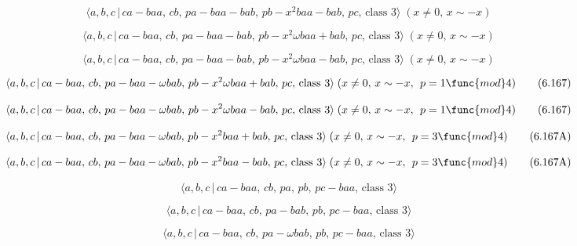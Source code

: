 \documentclass[10pt]{article}
\begin{document}
\begin{equation}
\langle a,b,c\,|\,ca-baa,\,cb,\,pa-baa-bab,\,pb-x^2baa-bab,\,pc,\,\text{
class }3\rangle\;(x \neq 0,\, x\sim -x)  \tag{6.165}
\end{equation}

\begin{equation}
\langle a,b,c\,|\,ca-baa,\,cb,\,pa-baa-bab,\,pb-x^{2}\omega baa+bab,\,pc,\,%
\text{class }3\rangle \;(x\neq 0,\,x\sim -x)  \tag{6.166}
\end{equation}

\begin{equation}
\langle a,b,c\,|\,ca-baa,\,cb,\,pa-baa-bab,\,pb-x^{2}\omega baa-bab,\,pc,\,%
\text{class }3\rangle \;(x\neq 0,\,x\sim -x)  \tag{6.166}
\end{equation}

\begin{equation}
\langle a,b,c\,|\,ca-baa,\,cb,\,pa-baa-\omega bab,\,pb-x^{2}\omega
baa+bab,\,pc,\,\text{class }3\rangle \;(x\neq 0,\,x\sim -x,\,\;p=1\func{mod}%
4)  \tag{6.167}
\end{equation}

\begin{equation}
\langle a,b,c\,|\,ca-baa,\,cb,\,pa-baa-\omega bab,\,pb-x^{2}\omega
baa-bab,\,pc,\,\text{class }3\rangle \;(x\neq 0,\,x\sim -x,\,\;p=1\func{mod}%
4)  \tag{6.167}
\end{equation}

\begin{equation}
\langle a,b,c\,|\,ca-baa,\,cb,\,pa-baa-\omega bab,\,pb-x^2baa+bab,\,pc,\,%
\text{class }3\rangle\;(x \neq 0,\, x\sim -x,\,\;p=3 \func{mod} 4) 
\tag{6.167A}
\end{equation}

\begin{equation}
\langle a,b,c\,|\,ca-baa,\,cb,\,pa-baa-\omega bab,\,pb-x^2baa-bab,\,pc,\,%
\text{class }3\rangle\;(x \neq 0,\, x\sim -x,\,\;p=3 \func{mod} 4) 
\tag{6.167A}
\end{equation}

\begin{equation}
\langle a,b,c\,|\,ca-baa,\,cb,\,pa,\,pb,\,pc-baa,\,\text{class }3\rangle 
\tag{6.168}
\end{equation}

\begin{equation}
\langle a,b,c\,|\,ca-baa,\,cb,\,pa-bab,\,pb,\,pc-baa,\,\text{class }3\rangle
\tag{6.169}
\end{equation}

\begin{equation}
\langle a,b,c\,|\,ca-baa,\,cb,\,pa-\omega bab,\,pb,\,pc-baa,\,\text{class }%
3\rangle  \tag{6.170}
\end{equation}
\end{document}
